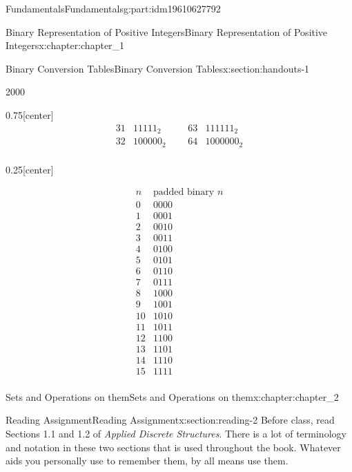 \documentclass[oneside,10pt,]{book}
\numberwithin{equation}{section}
\begin{document}
\begin{partptx}{Fundamentals}{}{Fundamentals}{}{}{g:part:idm19610627792}
\begin{chapterptx}{Binary Representation of Positive Integers}{}{Binary Representation of Positive Integers}{}{}{x:chapter:chapter_1}
\begin{sectionptx}{Binary Conversion Tables}{}{Binary Conversion Tables}{}{}{x:section:handouts-1}
\begin{sidebyside}{2}{0}{0}{0}
\begin{sbspanel}{0.75}[center]
\begin{equation*}
\begin{array}{ccccc}
31 & 11111_2 & \text{     } &
63 & 111111_2 \\
32 & 100000_2 & \text{     }
& 64 & 1000000_2 \\
\end{array}
\end{equation*}
%
\end{sbspanel}%
\begin{sbspanel}{0.25}[center]%
\par
%
\begin{equation*}
\begin{array}{cc}
n & \text{padded
binary } n \\
0 & 0000 \\
1 & 0001 \\
2 & 0010 \\
3 & 0011 \\
4 & 0100 \\
5 & 0101 \\
6 & 0110 \\
7 & 0111 \\
8 & 1000 \\
9 & 1001 \\
10 & 1010 \\
11 & 1011 \\
12 & 1100 \\
13 & 1101 \\
14 & 1110 \\
15 & 1111 \\
\end{array}
\end{equation*}
%
\end{sbspanel}%
\end{sidebyside}%
\end{sectionptx}
\end{chapterptx}
%
\typeout{************************************************}
\typeout{************************************************}
%
\begin{chapterptx}{Sets and Operations on them}{}{Sets and Operations on them}{}{}{x:chapter:chapter_2}
%
%
%
\typeout{************************************************}
\typeout{************************************************}
%
\begin{sectionptx}{Reading Assignment}{}{Reading Assignment}{}{}{x:section:reading-2}
Before class, read Sections 1.1 and 1.2 of \emph{Applied Discrete Structures}. There is a lot of terminology and notation in these two sections that is used throughout the book. Whatever aids you personally use to remember them, by all means use them.%

\end{sectionptx}
\end{chapterptx}
\end{partptx}
\end{document}
